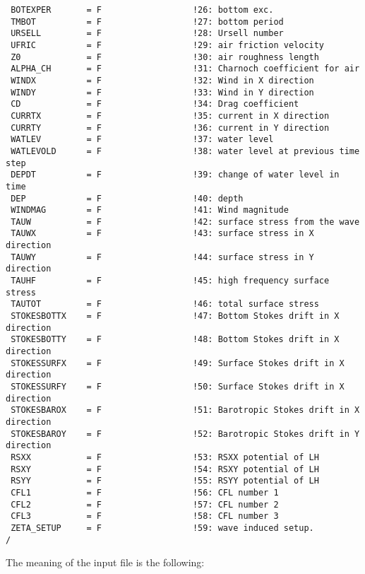 \documentclass[12pt]{amsart}
\begin{document}
\begin{verbatim}
 BOTEXPER       = F                  !26: bottom exc.  
 TMBOT          = F                  !27: bottom period 
 URSELL         = F                  !28: Ursell number
 UFRIC          = F                  !29: air friction velocity
 Z0             = F                  !30: air roughness length
 ALPHA_CH       = F                  !31: Charnoch coefficient for air
 WINDX          = F                  !32: Wind in X direction
 WINDY          = F                  !33: Wind in Y direction
 CD             = F                  !34: Drag coefficient
 CURRTX         = F                  !35: current in X direction
 CURRTY         = F                  !36: current in Y direction
 WATLEV         = F                  !37: water level
 WATLEVOLD      = F                  !38: water level at previous time step
 DEPDT          = F                  !39: change of water level in time
 DEP            = F                  !40: depth
 WINDMAG        = F                  !41: Wind magnitude
 TAUW           = F                  !42: surface stress from the wave
 TAUWX          = F                  !43: surface stress in X direction
 TAUWY          = F                  !44: surface stress in Y direction
 TAUHF          = F                  !45: high frequency surface stress
 TAUTOT         = F                  !46: total surface stress
 STOKESBOTTX    = F                  !47: Bottom Stokes drift in X direction
 STOKESBOTTY    = F                  !48: Bottom Stokes drift in X direction
 STOKESSURFX    = F                  !49: Surface Stokes drift in X direction
 STOKESSURFY    = F                  !50: Surface Stokes drift in X direction
 STOKESBAROX    = F                  !51: Barotropic Stokes drift in X direction
 STOKESBAROY    = F                  !52: Barotropic Stokes drift in Y direction
 RSXX           = F                  !53: RSXX potential of LH
 RSXY           = F                  !54: RSXY potential of LH
 RSYY           = F                  !55: RSYY potential of LH
 CFL1           = F                  !56: CFL number 1
 CFL2           = F                  !57: CFL number 2
 CFL3           = F                  !58: CFL number 3
 ZETA_SETUP     = F                  !59: wave induced setup.
/
\end{verbatim}
The meaning of the input file is the following:
\end{document}
